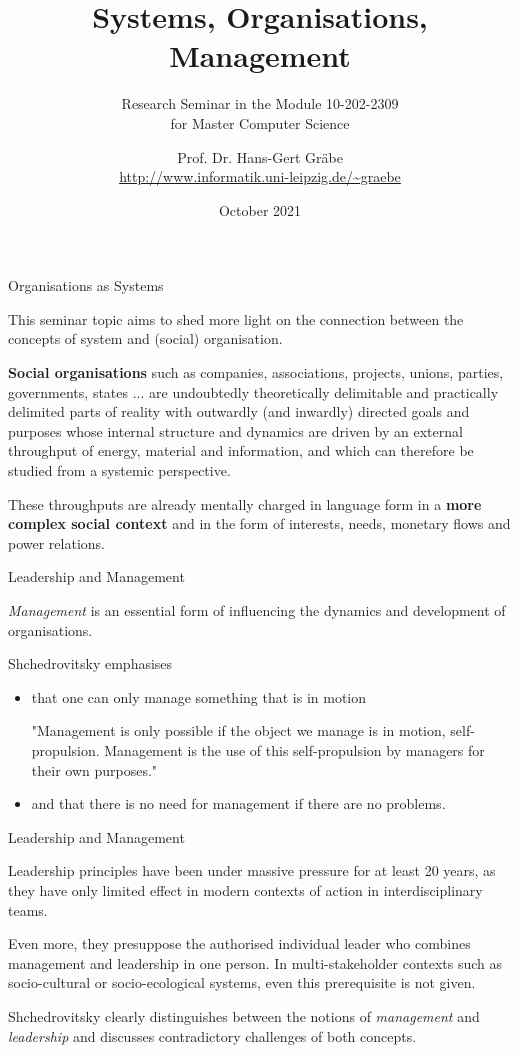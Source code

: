 \documentclass{beamer}
\title{Systems, Organisations, Management}
\subtitle{Research Seminar in the Module 10-202-2309\\ for Master Computer
  Science}
\author{Prof. Dr. Hans-Gert Gräbe\\
\url{http://www.informatik.uni-leipzig.de/~graebe}}
\date{October 2021}
\begin{document}
{
\begin{frame}
  \titlepage
\end{frame}}

\begin{frame}{Organisations as Systems}

This seminar topic aims to shed more light on the connection between the
concepts of system and (social) organisation.

\textbf{Social organisations} such as companies, associations, projects,
unions, parties, governments, states ... are undoubtedly theoretically
delimitable and practically delimited parts of reality with outwardly (and
inwardly) directed goals and purposes whose internal structure and dynamics
are driven by an external throughput of energy, material and information, and
which can therefore be studied from a systemic perspective.

These throughputs are already mentally charged in language form in a
\textbf{more complex social context} and in the form of interests, needs,
monetary flows and power relations.
\end{frame}
  
\begin{frame}{Leadership and Management}
  
\emph{Management} is an essential form of influencing the dynamics and
development of organisations.

Shchedrovitsky emphasises 
\begin{itemize}
\item that one can only manage something that is in motion

  "Management is only possible if the object we manage is in motion,
  self-propulsion. Management is the use of this self-propulsion by managers
  for their own purposes."

\item and that there is no need for management if there are no problems.
\end{itemize}

\end{frame}
  
\begin{frame}{Leadership and Management}
  
Leadership principles have been under massive pressure for at least 20 years,
as they have only limited effect in modern contexts of action in
interdisciplinary teams.

Even more, they presuppose the authorised individual leader who combines
management and leadership in one person. In multi-stakeholder contexts such as
socio-cultural or socio-ecological systems, even this prerequisite is not
given.

Shchedrovitsky clearly distinguishes between the notions of \emph{management}
and \emph{leadership} and discusses contradictory challenges of both concepts.
\end{frame}
  
\end{document}
